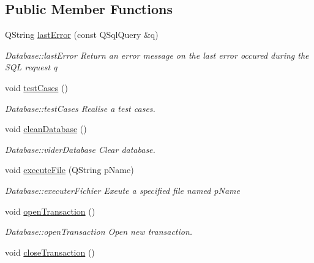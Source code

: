 \subsection*{Public Member Functions}
\begin{DoxyCompactItemize}
\item 
Q\+String \hyperlink{classDatabase_1_1Database_aff2b9057350d618d9f126a0e6ac6be42}{last\+Error} (const Q\+Sql\+Query \&q)
\begin{DoxyCompactList}\small\item\em Database\+::last\+Error Return an error message on the last error occured during the S\+Q\+L request {\itshape q} \end{DoxyCompactList}\item 
\hypertarget{classDatabase_1_1Database_a77460984575eb485e3c6dcfc713e0e67}{void \hyperlink{classDatabase_1_1Database_a77460984575eb485e3c6dcfc713e0e67}{test\+Cases} ()}\label{classDatabase_1_1Database_a77460984575eb485e3c6dcfc713e0e67}

\begin{DoxyCompactList}\small\item\em Database\+::test\+Cases Realise a test cases. \end{DoxyCompactList}\item 
\hypertarget{classDatabase_1_1Database_a474fda5b2ee6cd1391f72ad5fe297ba5}{void \hyperlink{classDatabase_1_1Database_a474fda5b2ee6cd1391f72ad5fe297ba5}{clean\+Database} ()}\label{classDatabase_1_1Database_a474fda5b2ee6cd1391f72ad5fe297ba5}

\begin{DoxyCompactList}\small\item\em Database\+::vider\+Database Clear database. \end{DoxyCompactList}\item 
void \hyperlink{classDatabase_1_1Database_a8fa0ebf8b613b8c25f2485dee5c332f3}{execute\+File} (Q\+String p\+Name)
\begin{DoxyCompactList}\small\item\em Database\+::executer\+Fichier Exeute a specified file named {\itshape p\+Name} \end{DoxyCompactList}\item 
\hypertarget{classDatabase_1_1Database_a657a65d7c085ef1b3fbc956d5c837ec0}{void \hyperlink{classDatabase_1_1Database_a657a65d7c085ef1b3fbc956d5c837ec0}{open\+Transaction} ()}\label{classDatabase_1_1Database_a657a65d7c085ef1b3fbc956d5c837ec0}

\begin{DoxyCompactList}\small\item\em Database\+::open\+Transaction Open new transaction. \end{DoxyCompactList}\item 
\hypertarget{classDatabase_1_1Database_a7cb02c000e1bc3614aeda31ea6c13069}{void \hyperlink{classDatabase_1_1Database_a7cb02c000e1bc3614aeda31ea6c13069}{close\+Transaction} ()}\label{classDatabase_1_1Database_a7cb02c000e1bc3614aeda31ea6c13069}


\end{DoxyCompactItemize}
